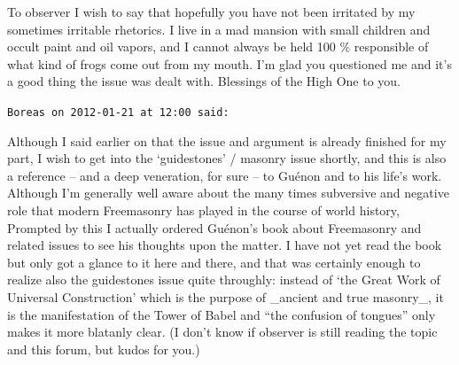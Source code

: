 \begin{footnotesize}
\begin{sffamily}
To observer I wish to say that hopefully you have not been irritated by my sometimes irritable rhetorics. I live in a mad mansion with small children and occult paint and oil vapors, and I cannot always be held 100 \% responsible of what kind of frogs come out from my mouth. I'm glad you questioned me and it's a good thing the issue was dealt with. Blessings of the High One to you.

\hfill

\texttt{Boreas on 2012-01-21 at 12:00 said:}

Although I said earlier on that the issue and argument is already finished for my part, I wish to get into the `guidestones' / masonry issue shortly, and this is also a reference -- and a deep veneration, for sure -- to Guénon and to his life's work. Although I'm generally well aware about the many times subversive and negative role that modern Freemasonry has played in the course of world history, Prompted by this I actually ordered Guénon's book about Freemasonry and related issues to see his thoughts upon the matter. I have not yet read the book but only got a glance to it here and there, and that was certainly enough to realize also the guidestones issue quite throughly: instead of `the Great Work of Universal Construction' which is the purpose of \_ancient and true masonry\_, it is the manifestation of the Tower of Babel and ``the confusion of tongues'' only makes it more blatanly clear. (I don't know if observer is still reading the topic and this forum, but kudos for you.)

\hfill

\end{sffamily}
\end{footnotesize}

